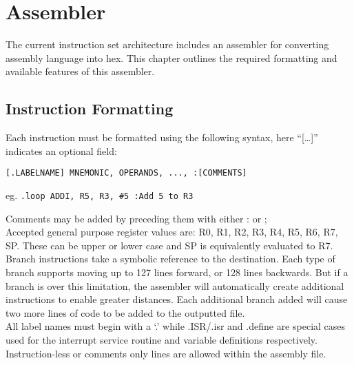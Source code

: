 
\section{Assembler}
The current instruction set architecture includes an assembler for converting assembly language into hex. This chapter outlines the required formatting and available features of this assembler. 

\subsection{Instruction Formatting}
Each instruction must be formatted using the following syntax, here ``[\dots]'' indicates an optional field:

\begin{center}\texttt{[.LABELNAME] MNEMONIC, OPERANDS, ..., :[COMMENTS]}\end{center}

\begin{center}eg. \texttt{.loop ADDI, R5, R3, \#5 :Add 5 to R3}
\end{center}

\noindent Comments may be added by preceding them with either : or ;\\

\noindent Accepted general purpose register values are: R0, R1, R2, R3, R4, R5, R6, R7, SP. These can be upper or lower case and SP is equivalently evaluated to R7.\\

\noindent Branch instructions take a symbolic reference to the destination. 
Each type of branch supports moving up to 127 lines forward, or 128 lines backwards. But if a branch is over this limitation, the assembler will automatically create additional instructions to enable greater distances. Each additional branch added will cause two more lines of code to be added to the outputted file. \\

\noindent All label names must begin with a `.' while .ISR/.isr and .define are special cases used for the interrupt service routine and variable definitions respectively. \\

\noindent Instruction-less or comments only lines are allowed within the assembly file. \\
\newpage
{}

